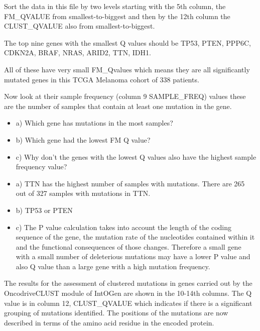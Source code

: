 \begin{steps}
Sort the data in this file by two levels starting with the 5th column,
the FM\_QVALUE from smallest-to-biggest and then by the 12th column the
CLUST\_QVALUE also from smallest-to-biggest.
\end{steps}

The top nine genes with the smallest Q values should be
TP53, PTEN, PPP6C, CDKN2A, BRAF, NRAS, ARID2, TTN, IDH1.

\begin{information}
All of these have very small FM\_Qvalues which means they are all significantly
mutated genes in this TCGA Melanoma cohort of 338 patients.
\end{information}

\begin{steps}
Now look at their sample frequency (column 9 SAMPLE\_FREQ) values these are
the number of samples that contain at least one mutation in the gene.
\end{steps}

\begin{questions}
\begin{itemize}
\item a) Which gene has mutations in the most samples?
\item b) Which gene had the lowest FM Q value?
\item c) Why don't the genes with the lowest Q values also have the highest sample frequency
value?
\end{itemize}
\end{questions}

\begin{answer}
\begin{itemize}
\item a) TTN has the highest number of samples with mutations. There are 265 out of 327
samples with mutations in TTN.
\item b) TP53 or PTEN
\item c) The P value calculation takes into account the length of the coding sequence
of the gene, the mutation rate of the nucleotides contained within it and the functional
consequences of those changes. Therefore a small gene with a small number of deleterious
mutations may have a lower P value and also Q value than a large gene with a high
mutation frequency.
\end{itemize}
\end{answer}

\begin{information}
The results for the assessment of clustered mutations in genes carried out by the
OncodriveCLUST module of IntOGen are shown in the 10-14th columns. The Q value is in
column 12, CLUST\_QVALUE which indicates if there is a significant grouping of mutations
identified. The positions of the mutations are now described in terms of the amino acid
residue in the encoded protein.
\end{information}


